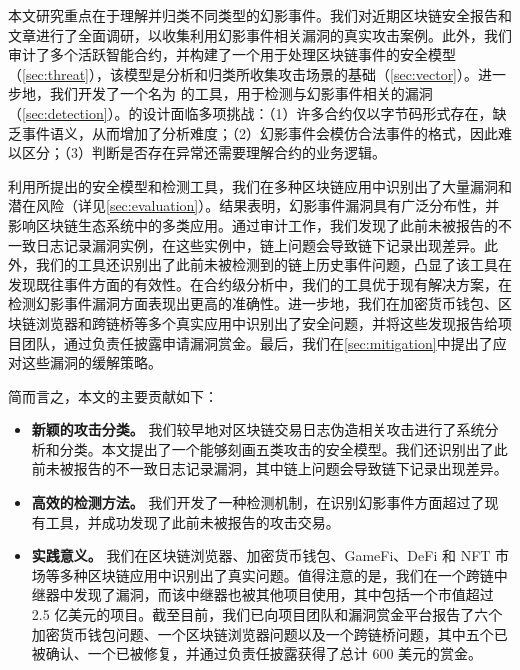 本文研究重点在于理解并归类不同类型的幻影事件。我们对近期区块链安全报告和文章进行了全面调研，以收集利用幻影事件相关漏洞的真实攻击案例。此外，我们审计了多个活跃智能合约，并构建了一个用于处理区块链事件的安全模型（\cref{sec:threat}），该模型是分析和归类所收集攻击场景的基础（\cref{sec:vector}）。进一步地，我们开发了一个名为 \tool 的工具，用于检测与幻影事件相关的漏洞（\cref{sec:detection}）。\tool 的设计面临多项挑战：（1）许多合约仅以字节码形式存在，缺乏事件语义，从而增加了分析难度；（2）幻影事件会模仿合法事件的格式，因此难以区分；（3）判断是否存在异常还需要理解合约的业务逻辑。

利用所提出的安全模型和检测工具，我们在多种区块链应用中识别出了大量漏洞和潜在风险（详见\cref{sec:evaluation}）。结果表明，幻影事件漏洞具有广泛分布性，并影响区块链生态系统中的多类应用。通过审计工作，我们发现了此前未被报告的不一致日志记录漏洞实例，在这些实例中，链上问题会导致链下记录出现差异。此外，我们的工具还识别出了此前未被检测到的链上历史事件问题，凸显了该工具在发现既往事件方面的有效性。在合约级分析中，我们的工具优于现有解决方案，在检测幻影事件漏洞方面表现出更高的准确性。进一步地，我们在加密货币钱包、区块链浏览器和跨链桥等多个真实应用中识别出了安全问题，并将这些发现报告给项目团队，通过负责任披露申请漏洞赏金。最后，我们在\cref{sec:mitigation}中提出了应对这些漏洞的缓解策略。

简而言之，本文的主要贡献如下：
\begin{itemize}
\item \textbf{新颖的攻击分类。}
我们较早地对区块链交易日志伪造相关攻击进行了系统分析和分类。本文提出了一个能够刻画五类攻击的安全模型。我们还识别出了此前未被报告的不一致日志记录漏洞，其中链上问题会导致链下记录出现差异。
\item \textbf{高效的检测方法。}
我们开发了一种检测机制，在识别幻影事件方面超过了现有工具，并成功发现了此前未被报告的攻击交易。
\item \textbf{实践意义。}
我们在区块链浏览器、加密货币钱包、GameFi、DeFi 和 NFT 市场等多种区块链应用中识别出了真实问题。值得注意的是，我们在一个跨链中继器中发现了漏洞，而该中继器也被其他项目使用，其中包括一个市值超过 2.5 亿美元的项目。截至目前，我们已向项目团队和漏洞赏金平台报告了六个加密货币钱包问题、一个区块链浏览器问题以及一个跨链桥问题，其中五个已被确认、一个已被修复，并通过负责任披露获得了总计 600 美元的赏金。
\end{itemize}
